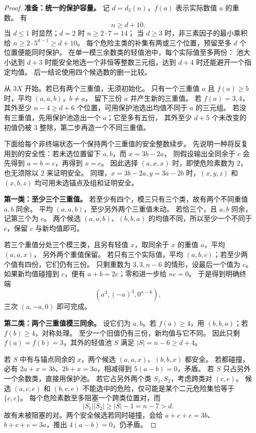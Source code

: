 \begin{proof}
\par\noindent\textbf{准备：统一的保护容量。}
记 $d=d_3(n)$，$f(a)$ 表示实际数值 $a$ 的重数。
有
\[
n\ge d+10.
\]
当 $d\le1$ 时显然；$d=2$ 时 $n\ge2\cdot7=14$；
当 $d\ge3$ 时，非三素因子的最小乘积给 $n\ge2\cdot5^{d-1}\ge d+10$。
每个危险主类的补集有两或三个位置，预留至多 $d$ 个位置便能同时保护。
在单一模三余数类的轻值池中，每个实际值至多两份：
池大小达到 $d+3$ 时能安全地选一个非恒等整数三元组，达到 $d+4$ 时还能避开一个指定均值。
后一结论使用四个候选数的删一比较。

从 $3X$ 开始。若已有两个三重值，无须初始化。
只有一个三重值 $a$ 且 $f(a)\ge5$ 时，平均 $(a,a,b)$，$b\ne a$，
留下三份 $a$ 并产生新的三重值。
若 $f(a)=3,4$，其外至少 $n-4\ge d+6$ 个位置，可用保护池选出均值不同于 $a$ 的三元组。
若没有三重值，先用保护池造出一个 $a$；它至多有五份，
其外至少 $d+5$ 个未改变的初值仍被 $3$ 整除，第二步再造一个不同三重值。

下面给每个非终端状态一个保持两个三重值的安全整数续步。
先说明一种将反复用到的安全性：若未选位置留下 $a,b$，而 $x=3b-2a$，
则假设输出全同余于 $c$ 会先得到 $a=b=c$，再得到 $x=c$。
因此选择 $(a,x,x)$ 时，即使危险素数为 $2$，也无须除以 $2$ 来证明安全。
同理，$x=3b-2a,y=3a-2b$ 时，$(x,y,z)$ 和 $(x,b,z)$ 均可用未选锚点及组和证明安全。

\par\noindent\textbf{第一类：至少三个三重值。}
若至少有四个，模三只有三个类，故有两个不同重值 $a,b$ 同余。
平均 $(a,a,b)$，至少另外两个三重值未动。
若恰三个，且 $a,b$ 同余，记第三个为 $c$。
两个候选 $(a,a,b)$、$(b,b,a)$ 的均值不同，所以至少一个不同于 $c$，保留 $c$ 与新均值即可。

若三个重值分处三个模三类，且另有轻值 $x$，取同余于 $x$ 的重值 $a$，平均 $(a,a,x)$，
另外两个重值保留。
若只有三个实际值，平均 $(a,b,c)$；若至少两个值有四份，它们仍有三份。
只剩重数为 $3,3,n-6$ 的情形，设最后一个值为 $c$。
如果新均值碰撞到 $c$，便有 $a+b=2c$；零和进一步给 $nc=0$。
于是得到明确终端
\[
(a^3,(-a)^3,0^{n-6}),
\]
三次 $(a,-a,0)$ 即可完成。

\par\noindent\textbf{第二类：两个三重值模三同余。}
设它们为 $a,b$。若 $f(a)\ge4$，用 $(b,b,a)$；若 $f(b)\ge4$，对称处理。
至少一个旧值仍有三份，新均值与它不同。
因此只剩 $f(a)=f(b)=3$，其外的轻值池 $S$ 满足 $|S|=n-6\ge d+4$。

若 $S$ 中有与锚点同余的 $x$，两个候选 $(a,a,x)$、$(b,b,x)$ 都安全。
若都碰撞，必有 $2a+x=3b$、$2b+x=3a$，相减得到 $5(a-b)=0$，矛盾。
若 $S$ 只占另外一个余数类，直接用保护池。
若它占另外两个类 $S_1,S_2$，考虑跨类对 $(c,e)$。
候选 $(a,c,e)$ 和 $(b,c,e)$ 不能选中的危险，仅可能是某个二元危险集恰等于 $\{c,e\}$。
每个危险素数至多阻塞一个跨类位置对，而
\[
|S_1||S_2|\ge |S|-1=n-7>d.
\]
故有未被阻塞的对。两个安全候选若同时碰撞，会给
$a+c+e=3b$、$b+c+e=3a$，推出 $4(a-b)=0$，仍矛盾。


\end{proof}
